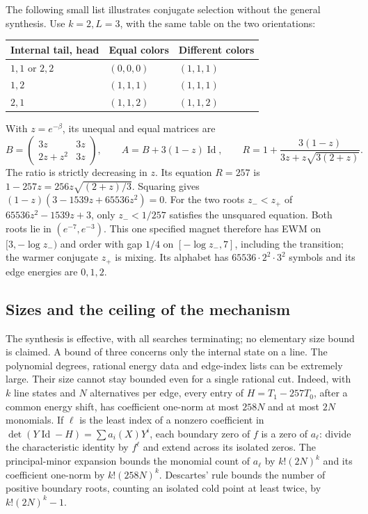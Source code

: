The following small list illustrates conjugate selection without the general synthesis. Use \(k=2,L=3\), with the same table on the two orientations:
\begin{center}
\begin{tabular}{@{}lll@{}}
\toprule
Internal tail, head & Equal colors & Different colors \\
\midrule
\(1,1\) or \(2,2\) & \((0,0,0)\) & \((1,1,1)\) \\
\(1,2\) & \((1,1,1)\) & \((1,1,1)\) \\
\(2,1\) & \((1,1,2)\) & \((1,1,2)\) \\
\bottomrule
\end{tabular}
\end{center}
With \(z=e^{-\beta}\), its unequal and equal matrices are
\[
B=\begin{pmatrix}3z&3z\\2z+z^2&3z\end{pmatrix},\qquad
A=B+3(1-z)\operatorname{Id},\qquad
R=1+\frac{3(1-z)}{3z+z\sqrt{3(2+z)}}.
\]
The ratio is strictly decreasing in \(z\). Its equation \(R=257\) is
\(1-257z=256z\sqrt{(2+z)/3}\). Squaring gives
\((1-z)(3-1539z+65536z^2)=0\). For the two roots \(z_-<z_+\) of \(65536z^2-1539z+3\), only \(z_-<1/257\) satisfies the unsquared equation. Both roots lie in \((e^{-7},e^{-3})\). This one specified magnet therefore has EWM on \([3,-\log z_-)\) and order with gap \(1/4\) on \([-\log z_-,7]\), including the transition; the warmer conjugate \(z_+\) is mixing. Its alphabet has \(65536\cdot2^2\cdot3^2\) symbols and its edge energies are \(0,1,2\).

\subsection{Sizes and the ceiling of the mechanism}\label{sec:ceiling}

The synthesis is effective, with all searches terminating; no elementary size bound is claimed. A bound of three concerns only the internal state on a line. The polynomial degrees, rational energy data and edge-index lists can be extremely large. Their size cannot stay bounded even for a single rational cut. Indeed, with \(k\) line states and \(N\) alternatives per edge, every entry of \(H=T_1-257T_0\), after a common energy shift, has coefficient one-norm at most \(258N\) and at most \(2N\) monomials. If \(\ell\) is the least index of a nonzero coefficient in \(\det(Y\operatorname{Id}-H)=\sum a_i(X)Y^i\), each boundary zero of \(f\) is a zero of \(a_\ell\): divide the characteristic identity by \(f^\ell\) and extend across its isolated zeros. The principal-minor expansion bounds the monomial count of \(a_\ell\) by \(k!(2N)^k\) and its coefficient one-norm by \(k!(258N)^k\). Descartes' rule bounds the number of positive boundary roots, counting an isolated cold point at least twice, by \(k!(2N)^k-1\).

